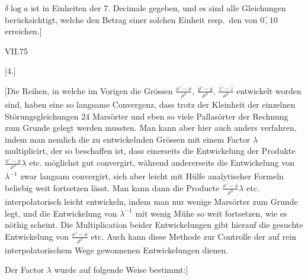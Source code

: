\par\noindent\hspace*{\parindent}\(\delta\log a\) ist in Einheiten der 7. Decimale gegeben, und es sind alle Gleichungen berücksichtigt, welche
den Betrag einer solchen Einheit resp.\ den von \(0\overset{\prime\prime}{,}10\) erreichen.]
\par\smallskip\noindent VII.\hfill 75\par
\par\endgroup

\par\medskip
{}
\begin{center}[4.]\end{center}
\begingroup
\small
\par\noindent\hspace*{\parindent}[Die Reihen, in welche im Vorigen die Grössen \(\frac{x'-x}{\rho^3}\), \(\frac{y'-y}{\rho^3}\), \(\frac{z'-z}{\rho^3}\) entwickelt worden sind,
haben eine so langsame Convergenz, dass trotz der Kleinheit der einzelnen Störungsgleichungen 24 Marsörter
und eben so viele Pallasörter der Rechnung zum Grunde gelegt werden mussten. Man kann aber hier
auch anders verfahren, indem man nemlich die zu entwickelnden Grössen mit einem Factor \(\lambda\) multiplicirt,
der so beschaffen ist, dass einerseits die Entwickelung der Produkte \(\frac{x'-x}{\rho^3}\lambda\) etc. möglichst gut convergirt,
während andererseits die Entwickelung von \(\lambda^{-1}\) zwar langsam convergirt, sich aber leicht mit Hülfe analytischer
Formeln beliebig weit fortsetzen lässt. Man kann dann die Producte \(\frac{x'-x}{\rho^3}\lambda\) etc. interpolatorisch
leicht entwickeln, indem man nur wenige Marsörter zum Grunde legt, und die Entwickelung von \(\lambda^{-1}\) mit
wenig Mühe so weit fortsetzen, wie es nöthig scheint. Die Multiplication beider Entwickelungen gibt hierauf
die gesuchte Entwickelung von \(\frac{x'-x}{\rho^3}\) etc. Auch kann diese Methode zur Controlle der auf rein interpolatorischem
Wege gewonnenen Entwickelungen dienen.
\par\noindent\hspace*{\parindent}Der Factor \(\lambda\) wurde auf folgende Weise bestimmt:]
\par\endgroup
\clearpage
\endgroup
